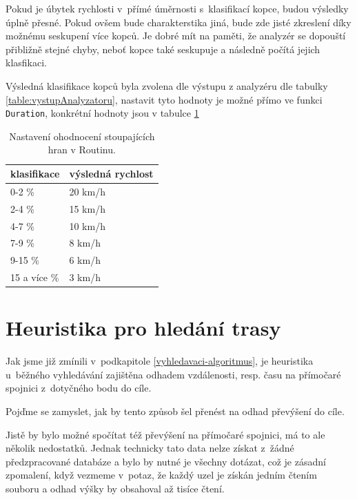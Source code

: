 \documentclass[thesis=B,czech]{FITthesis}[2012/06/26]
\begin{document}
Pokud je úbytek rychlosti v~přímé úměrnosti s~klasifikací kopce, budou výsledky úplně přesné. Pokud ovšem bude charakterstika jiná, bude zde jisté zkreslení díky možnému seskupení více kopců. Je dobré mít na paměti, že analyzér se dopouští přibližně stejné chyby, neboť kopce také seskupuje a následně počítá jejich klasfikaci.

Výsledná klasifikace kopců byla zvolena dle výstupu z analyzéru dle tabulky \ref{table:vystupAnalyzatoru}, nastavit tyto hodnoty je možné přímo ve funkci \verb|Duration|, konkrétní hodnoty jsou v tabulce \ref{table:hodnoty}


\begin{table}[h!]
\begin{tabular}{l|l} %
\textbf{klasifikace}	& \textbf{výsledná rychlost}	\\
\hline
0-2 \%	&	20 km/h	\\
2-4 \%	&	15 km/h	\\
4-7 \%	&	10 km/h	\\
7-9 \%	&	8 km/h	\\
9-15 \%	&	6 km/h	\\
15 a více \%	&	3 km/h	\\
\end{tabular}
\caption{Nastavení ohodnocení stoupajících hran v Routinu.}
\label{table:hodnoty}
\end{table}





\section{Heuristika pro hledání trasy}
Jak jsme již zmínili v~podkapitole \ref{vyhledavaci-algoritmus}, je heuristika u~běžného vyhledávání zajištěna odhadem vzdálenosti, resp. času na přímočaré spojnici z~dotyčného bodu do cíle.

Pojďme se zamyslet, jak by tento způsob šel přenést na odhad převýšení do cíle. 

Jistě by bylo možné spočítat též převýšení na přímočaré spojnici, má to ale několik nedostatků. Jednak technicky tato data nelze získat z~žádné předzpracované databáze a bylo by nutné je všechny dotázat, což je zásadní zpomalení, když vezmeme v~potaz, že každý uzel je získán jedním čtením souboru a odhad výšky by obsahoval až tisíce čtení.
\end{document}
